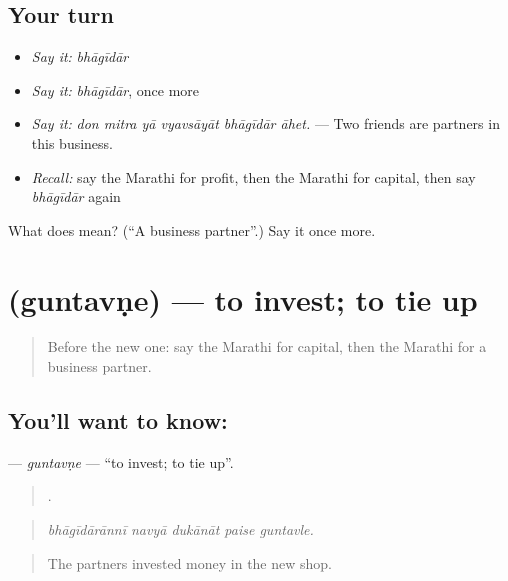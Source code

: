 \subsection*{Your turn}
\begin{itemize}
\raggedright
  \item \emph{Say it:} \emph{bhāgīdār}
  \item \emph{Say it:} \emph{bhāgīdār}, once more
  \item \emph{Say it:} \emph{don mitra yā vyavsāyāt bhāgīdār āhet.} — Two friends are partners in this business.
  \item \emph{Recall:} say the Marathi for profit, then the Marathi for capital, then say \emph{bhāgīdār} again
\end{itemize}

\begin{tcolorbox}[breakable,colback=teal!4,colframe=teal!35!black,title={Before you move on}]
What does  mean? (\textquotedblleft{}A business partner\textquotedblright{}.) Say it once more.
\end{tcolorbox}
\section[\texorpdfstring{\mr{गुंतवणे} (guntavṇe)}{गुंतवणे (guntavṇe)}]{ (guntavṇe) — to invest; to tie up}

\label{lesson:MR-C511-guntavne}



\begin{quote}
Before the new one: say the Marathi for capital, then the Marathi for a business partner.
\end{quote}

\subsection*{You'll want to know: }
\textbf{} — \emph{guntavṇe} — \textquotedblleft{}to invest; to tie up\textquotedblright{}.

\begin{quote}
    .
\end{quote}

\begin{quote}
\emph{bhāgīdārānnī navyā dukānāt paise guntavle.}
\end{quote}

\begin{quote}
The partners invested money in the new shop.
\end{quote}

